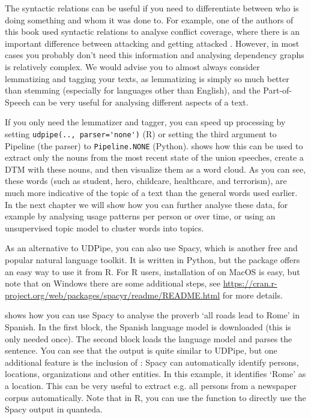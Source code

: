
The syntactic relations can be useful if you need to differentiate between who is doing something and whom it was done to.
For example, one of the authors of this book used syntactic relations to analyse conflict coverage,
where there is an important difference between attacking and getting attacked \citep{clause}.
However, in most cases you probably don't need this information and analysing dependency graphs is relatively complex.
We would advise you to almost always consider lemmatizing and tagging your texts, as lemmatizing is simply so much better than stemming
(especially for languages other than English), and the Part-of-Speech can be very useful for analysing different aspects of a text. 

If you only need the lemmatizer and tagger, you can speed up processing by setting \verb|udpipe(.., parser='none')| (R) or setting the third argument to Pipeline (the parser) to \verb|Pipeline.NONE| (Python).
 shows how this can be used to extract only the nouns from the most recent state of the union speeches,
create a DTM with these nouns, and then visualize them as a word cloud.
As you can see, these words (such as student, hero, childcare, healthcare, and terrorism), are much more indicative of the topic of a text than the general words used earlier.
In the next chapter we will show how you can further analyse these data, for example by analysing usage patterns per person or over time, or using an unsupervised topic model to cluster words into topics.


As an alternative to UDPipe, you can also use Spacy,
which is another free and popular natural language toolkit.
It is written in Python, but the  package offers an easy way to use it from R.
For R users, installation of  on MacOS is easy,
but note that on Windows there are some additional steps, see
\url{https://cran.r-project.org/web/packages/spacyr/readme/README.html} for more details.

 shows how you can use Spacy to analyse the proverb `all roads lead to Rome' in Spanish.
In the first block, the Spanish language model is downloaded (this is only needed once).
The second block loads the language model and parses the sentence.
You can see that the output is quite similar to UDPipe, but one additional feature is the inclusion of
:
Spacy can automatically identify persons, locations, organizations and other entities.
In this example, it identifies `Rome' as a location. 
This can be very useful to extract e.g. all persons from a newspaper corpus automatically.
Note that in R, you can use the  function  to directly use the Spacy output in quanteda.

